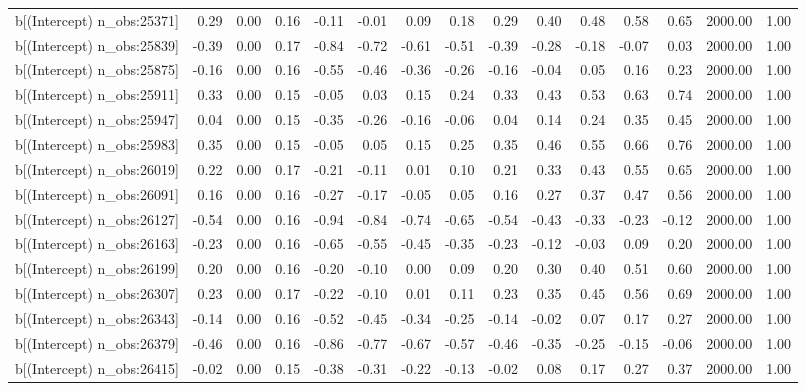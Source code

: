 \begin{table}[ht]
\begin{tabular}{rrrrrrrrrrrrrrr}
  b[(Intercept) n\_obs:25371] & 0.29 & 0.00 & 0.16 & -0.11 & -0.01 & 0.09 & 0.18 & 0.29 & 0.40 & 0.48 & 0.58 & 0.65 & 2000.00 & 1.00 \\ 
  b[(Intercept) n\_obs:25839] & -0.39 & 0.00 & 0.17 & -0.84 & -0.72 & -0.61 & -0.51 & -0.39 & -0.28 & -0.18 & -0.07 & 0.03 & 2000.00 & 1.00 \\ 
  b[(Intercept) n\_obs:25875] & -0.16 & 0.00 & 0.16 & -0.55 & -0.46 & -0.36 & -0.26 & -0.16 & -0.04 & 0.05 & 0.16 & 0.23 & 2000.00 & 1.00 \\ 
  b[(Intercept) n\_obs:25911] & 0.33 & 0.00 & 0.15 & -0.05 & 0.03 & 0.15 & 0.24 & 0.33 & 0.43 & 0.53 & 0.63 & 0.74 & 2000.00 & 1.00 \\ 
  b[(Intercept) n\_obs:25947] & 0.04 & 0.00 & 0.15 & -0.35 & -0.26 & -0.16 & -0.06 & 0.04 & 0.14 & 0.24 & 0.35 & 0.45 & 2000.00 & 1.00 \\ 
  b[(Intercept) n\_obs:25983] & 0.35 & 0.00 & 0.15 & -0.05 & 0.05 & 0.15 & 0.25 & 0.35 & 0.46 & 0.55 & 0.66 & 0.76 & 2000.00 & 1.00 \\ 
  b[(Intercept) n\_obs:26019] & 0.22 & 0.00 & 0.17 & -0.21 & -0.11 & 0.01 & 0.10 & 0.21 & 0.33 & 0.43 & 0.55 & 0.65 & 2000.00 & 1.00 \\ 
  b[(Intercept) n\_obs:26091] & 0.16 & 0.00 & 0.16 & -0.27 & -0.17 & -0.05 & 0.05 & 0.16 & 0.27 & 0.37 & 0.47 & 0.56 & 2000.00 & 1.00 \\ 
  b[(Intercept) n\_obs:26127] & -0.54 & 0.00 & 0.16 & -0.94 & -0.84 & -0.74 & -0.65 & -0.54 & -0.43 & -0.33 & -0.23 & -0.12 & 2000.00 & 1.00 \\ 
  b[(Intercept) n\_obs:26163] & -0.23 & 0.00 & 0.16 & -0.65 & -0.55 & -0.45 & -0.35 & -0.23 & -0.12 & -0.03 & 0.09 & 0.20 & 2000.00 & 1.00 \\ 
  b[(Intercept) n\_obs:26199] & 0.20 & 0.00 & 0.16 & -0.20 & -0.10 & 0.00 & 0.09 & 0.20 & 0.30 & 0.40 & 0.51 & 0.60 & 2000.00 & 1.00 \\ 
  b[(Intercept) n\_obs:26307] & 0.23 & 0.00 & 0.17 & -0.22 & -0.10 & 0.01 & 0.11 & 0.23 & 0.35 & 0.45 & 0.56 & 0.69 & 2000.00 & 1.00 \\ 
  b[(Intercept) n\_obs:26343] & -0.14 & 0.00 & 0.16 & -0.52 & -0.45 & -0.34 & -0.25 & -0.14 & -0.02 & 0.07 & 0.17 & 0.27 & 2000.00 & 1.00 \\ 
  b[(Intercept) n\_obs:26379] & -0.46 & 0.00 & 0.16 & -0.86 & -0.77 & -0.67 & -0.57 & -0.46 & -0.35 & -0.25 & -0.15 & -0.06 & 2000.00 & 1.00 \\ 
  b[(Intercept) n\_obs:26415] & -0.02 & 0.00 & 0.15 & -0.38 & -0.31 & -0.22 & -0.13 & -0.02 & 0.08 & 0.17 & 0.27 & 0.37 & 2000.00 & 1.00 \\ 

\end{tabular}
\end{table}
